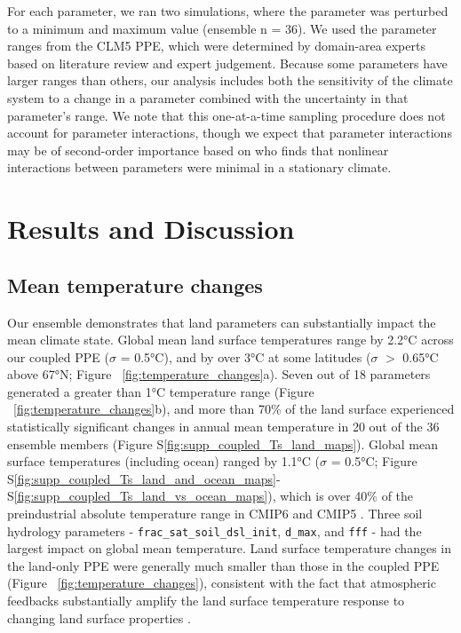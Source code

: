 \documentclass[draft]{agujournal2019}
\begin{document}
For each parameter, we ran two simulations, where the parameter was perturbed to a minimum and maximum value (ensemble n = 36). We used the parameter ranges from the CLM5 PPE, which were determined by domain-area experts based on literature review and expert judgement. Because some parameters have larger ranges than others, our analysis includes both the sensitivity of the climate system to a change in a parameter combined with the uncertainty in that parameter’s range. We note that this one-at-a-time sampling procedure does not account for parameter interactions, though we expect that parameter interactions may be of second-order importance based on \cite{fischer_quantifying_2011} who finds that nonlinear interactions between parameters were minimal in a stationary climate.

\section{Results and Discussion} 
\subsection{Mean temperature changes}
Our ensemble demonstrates that land parameters can substantially impact the mean climate state. Global mean land surface temperatures range by 2.2°C across our coupled PPE ($\sigma$ = 0.5°C), and by over 3°C at some latitudes ($\sigma$ $>$ 0.65°C above 67°N; Figure ~\ref{fig:temperature_changes}a). Seven out of 18 parameters generated a greater than 1°C temperature range (Figure ~\ref{fig:temperature_changes}b), and more than 70$\%$ of the land surface experienced statistically significant changes in annual mean temperature in 20 out of the 36 ensemble members (Figure S\ref{fig:supp_coupled_Ts_land_maps}). Global mean surface temperatures (including ocean) ranged by 1.1°C ($\sigma$ = 0.5°C; Figure S\ref{fig:supp_coupled_Ts_land_and_ocean_maps}- S\ref{fig:supp_coupled_Ts_land_vs_ocean_maps}), which is over 40$\%$ of the preindustrial absolute temperature range in CMIP6 \citep[2.4°C, $\sigma$=0.58°C;][]{tett_does_2022} and CMIP5 \citep{hawkins_connecting_2016}. Three soil hydrology parameters - \texttt{frac_sat_soil_dsl_init}, \texttt{d_max}, and \texttt{fff} - had the largest impact on global mean temperature. Land surface temperature changes in the land-only PPE were generally much smaller than those in the coupled PPE (Figure ~\ref{fig:temperature_changes}), consistent with the fact that atmospheric feedbacks substantially amplify the land surface temperature response to changing land surface properties \citep{lague_separating_2019}.
\end{document}
